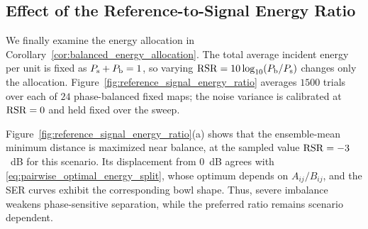 \documentclass[journal]{IEEEtran}
\begin{document}




\subsection{Effect of the Reference-to-Signal Energy Ratio}

We finally examine the energy allocation in
Corollary~\ref{cor:balanced_energy_allocation}. The total average incident energy
per unit is fixed as $P_{\rm s}+P_{\rm b}=1$, so varying
${\rm RSR}=10\log_{10}(P_{\rm b}/P_{\rm s})$ changes only the allocation.
Figure~\ref{fig:reference_signal_energy_ratio} averages $1500$ trials over each
of $24$ phase-balanced fixed maps; the noise variance is calibrated at
${\rm RSR}=0$ and held fixed over the sweep.

Figure~\ref{fig:reference_signal_energy_ratio}(a) shows that the ensemble-mean
minimum distance is maximized near balance, at the sampled value
${\rm RSR}=-3$~dB for this scenario. Its displacement from $0$~dB agrees with
\eqref{eq:pairwise_optimal_energy_split}, whose optimum depends on
$A_{ij}/B_{ij}$, and the SER curves exhibit the corresponding bowl shape.
Thus, severe imbalance weakens phase-sensitive separation, while the preferred
ratio remains scenario dependent.
\end{document}

